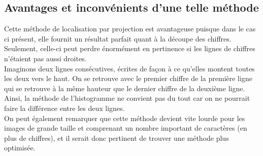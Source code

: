 \subsection{Avantages et inconvénients d'une telle méthode}
Cette méthode de localisation par projection est avantageuse puisque dans le cas ci présent, elle fournit un résultat parfait quant à la découpe des chiffres. Seulement, celle-ci peut perdre énormément en pertinence si les lignes de chiffres  n'étaient pas aussi droites.\\
Imaginons deux lignes consécutives, écrites de façon à ce qu'elles montent toutes les deux vers le haut. On se retrouve avec le premier chiffre de la première ligne qui se retrouve à la même hauteur que le dernier chiffre de la deuxième ligne. Ainsi, la méthode de l'histogramme ne convient pas du tout car on ne pourrait faire la différence entre les deux lignes.\\
On peut également remarquer que cette méthode devient vite lourde pour les images de grande taille et comprenant un nombre important de caractères (en plus de chiffres), et il serait donc pertinent de trouver une méthode plus optimisée.